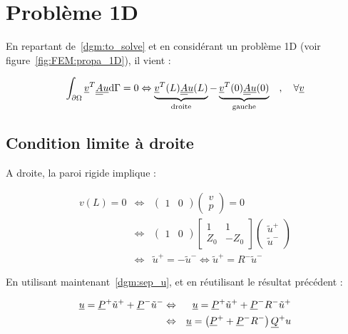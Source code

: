 \section{Problème 1D}

En repartant de~\eqref{dgm:to_solve} et en considérant un problème 1D (voir figure~\ref{fig:FEM:propa_1D}), il vient :

\begin{equation}
    \int_{\partial\Omega}\underline{v}^T\underline{\underline{A}}\underline{u}\mathrm{d}\Gamma = 0 \Leftrightarrow
\underbrace{\underline{v}^T(L)\underline{\underline{A}}\underline{u}(L)}_\mathrm{droite} - \underbrace{\underline{v}^T(0)\underline{\underline{A}}\underline{u}(0)}_\mathrm{gauche}
\quad,\quad \forall\underline{v}\label{dgm:d_g}
\end{equation}

\subsection{Condition limite à droite}

A droite, la paroi rigide implique :

\begin{eqnarray*}
    v(L) = 0 & \Leftrightarrow &
    \begin{pmatrix}
        1 & 0
    \end{pmatrix}
    \begin{pmatrix}
        v\\p
    \end{pmatrix}
     = 0\\
    & \Leftrightarrow &
    \begin{pmatrix}
        1 & 0
    \end{pmatrix}
    \begin{bmatrix}
        1 & 1\\
        Z_0 & -Z_0
    \end{bmatrix}
    \begin{pmatrix}
        \tilde{u}^+\\\tilde{u}^-
    \end{pmatrix}\\
    & \Leftrightarrow &
    \tilde{u}^+ = -\tilde{u}^- \Leftrightarrow \tilde{u}^+ = R^-\tilde{u}^-
\end{eqnarray*}

En utilisant maintenant~\eqref{dgm:sep_u}, et en réutilisant le résultat précédent :

\begin{eqnarray}
    \underline{u} = \underline{P}^+\tilde{u}^+ + \underline{P}^-\tilde{u}^-
        & \Leftrightarrow & \underline{u} = \underline{P}^+\tilde{u}^+ + \underline{P}^-R^-\tilde{u}^+\notag\\
        & \Leftrightarrow & \underline{u} = \left(\underline{P}^+ + \underline{P}^-R^-\right)\underline{Q}^+u\label{dgm:droite}
\end{eqnarray}


